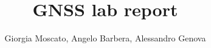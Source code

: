 \documentclass[sigconf]{acmart}
\begin{document}
\fancyhead{}
\def\thetitle{GNSS lab report}
\title{\thetitle}

\author{Giorgia Moscato, Angelo Barbera, Alessandro Genova}

\date{}


\acmPrice{}
\acmISBN{}
\acmDOI{}

\maketitle
{}

 










\end{document}
